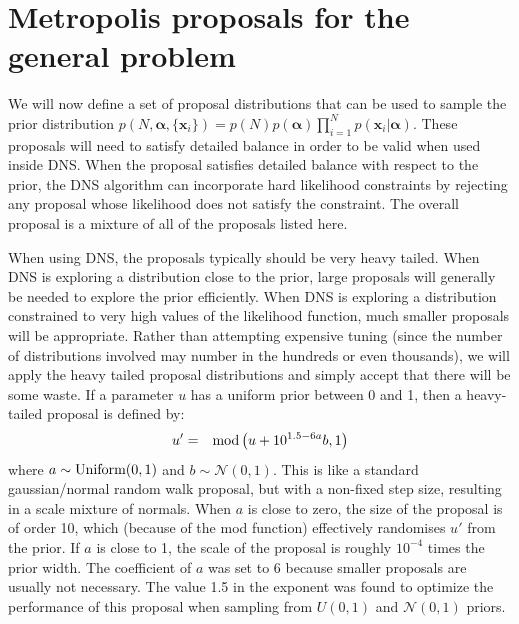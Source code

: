 \documentclass[letterpaper, 11pt]{article}
\newcommand{\hyperparams}{\boldsymbol{\alpha}}
\newcommand{\xx}{\mathbf{x}}
\begin{document}


\section{Metropolis proposals for the general problem}
We will now define a set of proposal distributions that can be used to
sample the prior distribution
$p(N, \hyperparams, \{\xx_i\}) = p(N) p(\hyperparams) \prod_{i=1}^N p(\xx_i | \hyperparams)$.
These proposals will need to satisfy detailed balance in order to be valid
when used inside DNS. When the proposal satisfies detailed balance with respect
to the prior, the DNS algorithm can incorporate hard likelihood constraints by
rejecting any proposal whose likelihood does not satisfy the constraint.
The overall proposal is a mixture of all of the proposals listed here.

When using DNS,
the proposals typically should be very heavy tailed. When
DNS is exploring a distribution close to the prior, large proposals will
generally be needed to explore the prior efficiently.
When DNS is exploring a distribution constrained to
very high values of the likelihood function, much smaller proposals will be
appropriate. Rather than attempting expensive tuning (since the number of
distributions involved may number in the hundreds or even thousands), we will
apply the heavy tailed proposal distributions and simply accept that there will
be some waste. If a parameter $u$ has a uniform prior between 0 and 1, then
a heavy-tailed proposal is defined by:
\begin{eqnarray}
u' &=& \textnormal{mod}\left(u + 10^{1.5 - 6a}b, 1\right)
\end{eqnarray}
where $a \sim \textnormal{Uniform}(0, 1)$ and $b\sim \mathcal{N}(0,1)$.
This is like a standard gaussian/normal random walk proposal, but with a
non-fixed step size, resulting in a scale mixture of normals.
When
$a$ is close to zero, the size of the proposal is of order 10, which (because
of the mod function) effectively randomises $u'$ from the prior. If $a$ is
close to 1, the scale of the proposal is roughly $10^{-4}$ times the prior
width. The coefficient of $a$ was set to 6 because smaller proposals are
usually not necessary. The value 1.5 in the exponent was found to optimize the
performance of this proposal when sampling from $U(0, 1)$ and $\mathcal{N}(0,1)$
priors.
\end{document}
